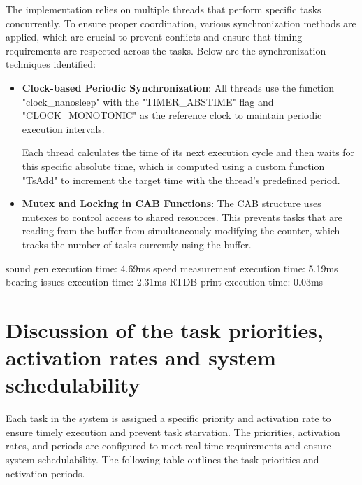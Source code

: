 \documentclass[a4paper,12pt]{article}
\begin{document}
The implementation relies on multiple threads that perform specific tasks concurrently. To ensure proper coordination, various synchronization methods are applied, which are crucial to prevent conflicts and ensure that timing requirements are respected across the tasks. Below are the synchronization techniques identified:
\begin{itemize}
    \sloppy
    \item \textbf{Clock-based Periodic Synchronization}: All threads use the function  "clock\_nanosleep" with the "TIMER\_ABSTIME" flag and "CLOCK\_MONOTONIC" as the reference clock to maintain periodic execution intervals.
    
    Each thread calculates the time of its next execution cycle and then waits for this specific absolute time, which is computed using a custom function "TsAdd" to increment the target time with the thread's predefined period.
    
    \item \textbf{Mutex and Locking in CAB Functions}: The CAB structure uses mutexes to control access to shared resources. This prevents tasks that are reading from the buffer from simultaneously modifying the counter, which tracks the number of tasks currently using the buffer.

    

\end{itemize}


sound gen execution time: 4.69ms
speed measurement execution time: 5.19ms
bearing issues execution time: 2.31ms
RTDB print execution time: 0.03ms


    
\section{Discussion of the task priorities, activation rates and system schedulability}


Each task in the system is assigned a specific priority and activation rate to ensure timely execution and prevent task starvation. The priorities, activation rates, and periods are configured to meet real-time requirements and ensure system schedulability. The following table outlines the task priorities and activation periods.
\end{document}
